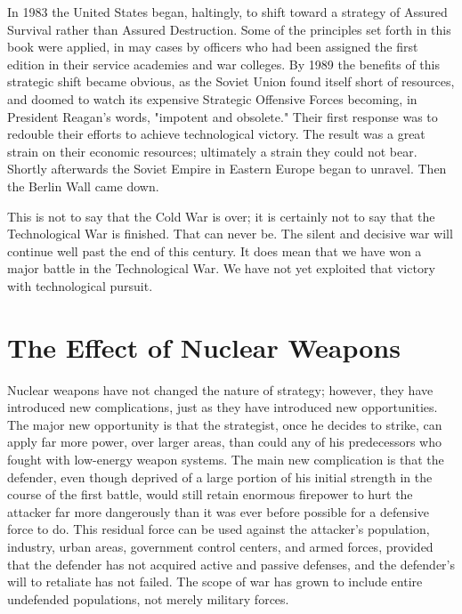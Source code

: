 \begin{mdframed}[backgroundcolor=black!10]
In 1983 the United States began, haltingly, to shift toward a strategy of Assured Survival rather than Assured Destruction. Some of the principles set forth in this book were applied, in may cases by officers who had been assigned the first edition in their service academies and war colleges.
By 1989 the benefits of this strategic shift became obvious, as the Soviet Union found itself short of resources, and doomed to watch its expensive Strategic Offensive Forces becoming, in President Reagan's words, "impotent and obsolete." Their first response was to redouble their efforts to achieve technological victory. The result was a great strain on their economic resources; ultimately a strain they could not bear. Shortly afterwards the Soviet Empire in Eastern Europe began to unravel. Then the Berlin Wall came down.

This is not to say that the Cold War is over; it is certainly not to say that the Technological War is finished. That can never be. The silent and decisive war will continue well past the end of this century. It does mean that we have won a major battle in the Technological War. We have not yet exploited that victory with technological pursuit.
\end{mdframed}

\section{The Effect of Nuclear Weapons}
Nuclear weapons have not changed the nature of strategy; however, they have introduced new complications, just as they have introduced new opportunities. The major new opportunity is that the strategist, once he decides to strike, can apply far more power, over larger areas, than could any of his predecessors who fought with low-energy weapon systems. The main new complication is that the defender, even though deprived of a large portion of his initial strength in the course of the first battle, would still retain enormous firepower to hurt the attacker far more dangerously than it was ever before possible for a defensive force to do. This residual force can be used against the attacker's population, industry, urban areas, government control centers, and armed forces, provided that the defender has not acquired active and passive defenses, and the defender's will to retaliate has not failed. The scope of war has grown to include entire undefended populations, not merely military forces.

